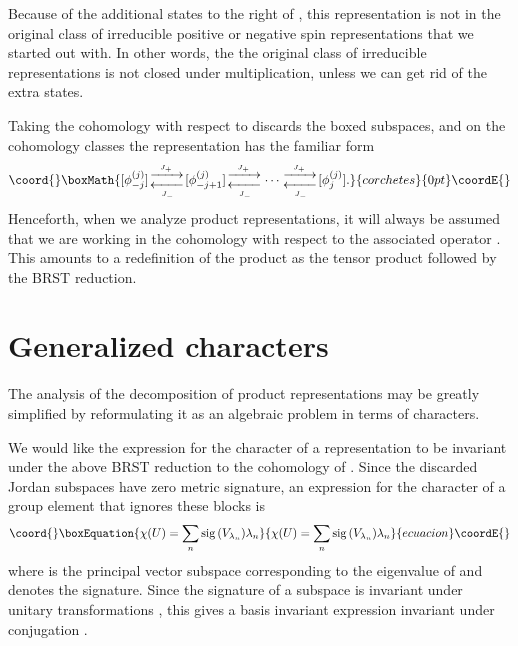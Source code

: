 \documentclass[a4paper,dvips,12pt]{article}
\providecommand {\sig} {\mathrm{sig}\,}
\providecommand {\Jpmarrow} {\genfrac{}{}{0pt}{1}{\xrightarrow{\phantom{n}J_+\phantom{n}}}
                         {\xleftarrow[\phantom{n}J_-\phantom{n}]{}}}
\begin{document}
    Because of the additional states to the right of
    \coordHE{}, this representation is not in the
    original class of irreducible
    positive or negative spin representations that we started
    out with.  In other words, the the original class of
    irreducible representations is not closed under
    multiplication, unless we can get rid of the extra states.

    Taking the cohomology with respect to \coordHE{} discards
    the boxed subspaces, and on the cohomology
    classes the representation has the familiar form
    \[\coord{}\boxMath{
        [\phi_{-j}^{(j)}]
        \Jpmarrow [\phi_{-j+1}^{(j)}]
        \Jpmarrow \cdots
        \Jpmarrow [\phi_{j}^{(j)}].
    }{corchetes}{0pt}\coordE{}\]
    Henceforth, when we analyze product representations, it will
    always be assumed that we are working in the cohomology with respect to the
    associated operator \coordHE{}.  This amounts to a redefinition of
    the product as the tensor product followed by the BRST
    reduction.


    \section{Generalized characters}

    The analysis of the decomposition of product representations
    may be greatly simplified by reformulating it as an algebraic
    problem in terms of characters.

    We would like the expression for the character of a representation
    to be invariant under the above
    BRST reduction to the cohomology of \coordHE{}.
    Since the discarded Jordan subspaces have zero metric
    signature, an expression for the character of a
    group element \coordHE{} that ignores these blocks is
    \begin{equation}\coord{}\boxEquation{
        \chi(U) = \sum_n \sig (V_{\lambda_n}) \lambda_n
        \label{CHARACTER}
    }{
        \chi(U) = \sum_n \sig (V_{\lambda_n}) \lambda_n
        }{ecuacion}\coordE{}\end{equation}
    where \coordHE{} is the principal vector subspace
    corresponding to the eigenvalue \coordHE{} of \coordHE{} and \myHighlight{$\sig(\cdot)$}\coordHE{}
    denotes the signature.  Since the signature
    of a subspace is invariant under unitary transformations \coordHE{} \cite{MALCEV}, this
    gives a basis invariant expression
    invariant under conjugation \coordHE{}.
\end{document}
